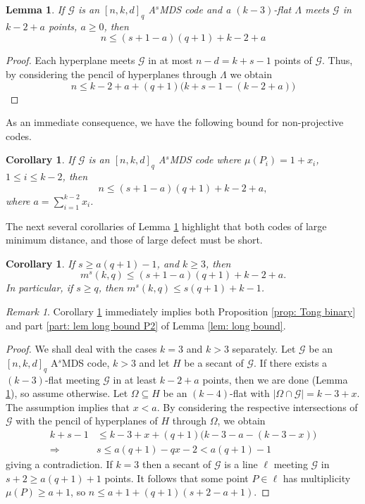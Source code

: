 \documentclass[11pt,a4paper]{amsart}
\newcommand{\AS}{ A$^s$MDS }
\newcommand{\G}{\mathcal{G}}
\theoremstyle{plain}
\newtheorem{lemma}[theorem]{Lemma}
\newtheorem{corollary}[theorem]{Corollary}
\theoremstyle{definition}
\theoremstyle{remark}
\newtheorem{remark}[theorem]{Remark}
\begin{document}
	\begin{lemma} \label{lem: fat k-3 flat short code}
		If $\G$ is an $[n,k,d]_q$ \AS code and a $(k-3)$-flat $\Lambda$ meets $\G$ in $k-2+a$ points, $a\ge 0$, then
		\[
		n\le (s+1-a)(q+1)+ k-2+a
		\]
	\end{lemma}
	\begin{proof}
		Each hyperplane meets $\G$ in at most $n-d=k+s-1$ points of $\G$. Thus, by considering the pencil of hyperplanes through $\Lambda$ we obtain
		\[
		n\le k-2+a+(q+1)\bigl(k+s-1-(k-2+a)\bigr)
		\]
	\end{proof}
	As an immediate consequence, we have the following bound for non-projective codes.
	\begin{corollary}
		If $\G$ is an $[n,k,d]_q$ \AS  code where $\mu(P_i)=1+x_i$, $1\le i \le k-2$, then
		\[
		n\le (s+1-a)(q+1)+ k-2+a,
		\]
		where $a=\sum_{i=1}^{k-2}x_i$.
	\end{corollary}

	The next several corollaries of Lemma \ref{lem: fat k-3 flat short code} highlight that both codes of large minimum distance, and those of large defect must be short.

	\begin{corollary}\label{cor: big s short code}
		If $s\ge a (q+1)-1$, and $k\ge 3$, then  \[m^s(k,q)\le (s+1-a)(q+1)+k-2+a.\]
		In particular, if $s\ge q$, then  $m^s(k,q)\le s(q+1)+k-1$.
	\end{corollary}

	\begin{remark}
		Corollary \ref{cor: big s short code} immediately implies both Proposition \ref{prop: Tong binary} and part \ref{part: lem long bound P2} of Lemma \ref{lem: long bound}.
	\end{remark}

	\begin{proof}
		We shall deal with the cases $k=3$ and $k>3$ separately. Let $\G$ be an $[n,k,d]_q$ \AS code, $k>3$ and let $H$ be a secant of $\G$. If there exists a $(k-3)$-flat meeting $\G$ in at least $k-2+a$ points, then we are done (Lemma \ref{lem: fat k-3 flat short code}), so assume otherwise.  Let $\Omega\subseteq H $ be an $(k-4)$-flat with $|\Omega \cap \G| = k-3+x$. The assumption implies that $x<a$. By considering the respective intersections of $\G$ with the pencil of hyperplanes of $H$ through $\Omega$, we obtain
		\begin{align*}
			k+s-1& \le k-3+x+(q+1)\bigl(k-3-a-(k-3-x)\bigr) \\
			\Rightarrow\;\;\; & s \le a(q+1)-qx-2<a(q+1)-1
		\end{align*}
		giving a contradiction.
		If $k=3$ then a secant of $\G$ is a line $\ell$ meeting $\G$ in $s+2 \ge a(q+1)+1$ points. It follows that some point $P\in \ell$ has multiplicity $\mu(P)\ge a+1$, so $n\le a+1+ (q+1)(s+2-a+1)$.
	\end{proof}
\end{document}
